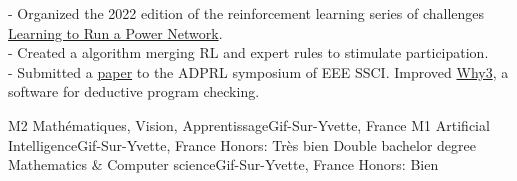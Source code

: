 \documentclass[
    10pt,
    A4,
    english,
    draft = false,
    twoside = false,
]{article}
\begin{document}
	
	
	{
	  - Organized the 2022 edition of the reinforcement learning              series of challenges
	   \href{https://l2rpn.chalearn.org/}{Learning to Run a Power Network}.\\
	  - Created a algorithm merging RL and expert rules to stimulate
        participation.\\
      - Submitted a
	    \href{https://hal.inria.fr/hal-03726294v2}{paper} to the ADPRL symposium of EEE SSCI.
	    \vspace*{0.2cm}
	}
	{Improved \href{https://why3.lri.fr/}{Why3}, a software for
	deductive program checking.}
	
	{M2 Mathématiques, Vision, Apprentissage}{Gif-Sur-Yvette, France}
	{}
	{M1 Artificial Intelligence}{Gif-Sur-Yvette, France}
	{Honors: Très bien}
	{Double bachelor degree Mathematics \& Computer science}{Gif-Sur-Yvette,
	France}
	{Honors: Bien}
	
\end{document}
